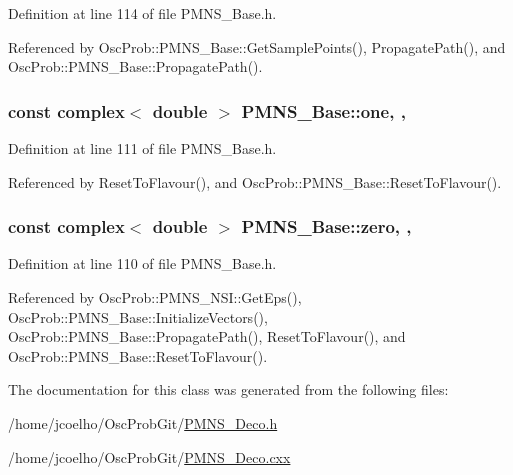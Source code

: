 Definition at line 114 of file P\+M\+N\+S\+\_\+\+Base.\+h.



Referenced by Osc\+Prob\+::\+P\+M\+N\+S\+\_\+\+Base\+::\+Get\+Sample\+Points(), Propagate\+Path(), and Osc\+Prob\+::\+P\+M\+N\+S\+\_\+\+Base\+::\+Propagate\+Path().

\subsubsection[{\texorpdfstring{one}{one}}]{\setlength{\rightskip}{0pt plus 5cm}const {\bf complex}$<$ double $>$ P\+M\+N\+S\+\_\+\+Base\+::one\hspace{0.3cm}{\ttfamily [static]}, {\ttfamily [protected]}, {\ttfamily [inherited]}}\hypertarget{classOscProb_1_1PMNS__Base_ab64aab27448a5aca27565c991a9d173e}{}\label{classOscProb_1_1PMNS__Base_ab64aab27448a5aca27565c991a9d173e}


Definition at line 111 of file P\+M\+N\+S\+\_\+\+Base.\+h.



Referenced by Reset\+To\+Flavour(), and Osc\+Prob\+::\+P\+M\+N\+S\+\_\+\+Base\+::\+Reset\+To\+Flavour().

\subsubsection[{\texorpdfstring{zero}{zero}}]{\setlength{\rightskip}{0pt plus 5cm}const {\bf complex}$<$ double $>$ P\+M\+N\+S\+\_\+\+Base\+::zero\hspace{0.3cm}{\ttfamily [static]}, {\ttfamily [protected]}, {\ttfamily [inherited]}}\hypertarget{classOscProb_1_1PMNS__Base_a5c31ed4593cf95feb36fb80c1850d25e}{}\label{classOscProb_1_1PMNS__Base_a5c31ed4593cf95feb36fb80c1850d25e}


Definition at line 110 of file P\+M\+N\+S\+\_\+\+Base.\+h.



Referenced by Osc\+Prob\+::\+P\+M\+N\+S\+\_\+\+N\+S\+I\+::\+Get\+Eps(), Osc\+Prob\+::\+P\+M\+N\+S\+\_\+\+Base\+::\+Initialize\+Vectors(), Osc\+Prob\+::\+P\+M\+N\+S\+\_\+\+Base\+::\+Propagate\+Path(), Reset\+To\+Flavour(), and Osc\+Prob\+::\+P\+M\+N\+S\+\_\+\+Base\+::\+Reset\+To\+Flavour().



The documentation for this class was generated from the following files\+:\begin{DoxyCompactItemize}
\item 
/home/jcoelho/\+Osc\+Prob\+Git/\hyperlink{PMNS__Deco_8h}{P\+M\+N\+S\+\_\+\+Deco.\+h}\item 
/home/jcoelho/\+Osc\+Prob\+Git/\hyperlink{PMNS__Deco_8cxx}{P\+M\+N\+S\+\_\+\+Deco.\+cxx}\end{DoxyCompactItemize}
